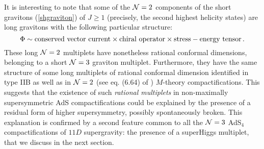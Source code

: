 \documentclass[a4paper,12pt]{article}
\begin{document}
It is interesting to note that some of the ${\cal N}=2$ components
of the short gravitons (\ref{shgraviton}) of $J\geq 1$ (precisely,
the second highest helicity states) are long gravitons with the
following particular structure:
\begin{equation}
  \Phi\sim{\rm conserved\ vector\ current}\times
  {\rm chiral\ operator}\times{\rm stress-energy\ tensor}\,.
\label{rational}
\end{equation}
These long ${\cal N}=2$ multiplets have nonetheless rational conformal
dimensions, belonging to a short ${\cal N}=3$ graviton multiplet.
Furthermore, they have the same structure of some long multiplets of
rational conformal dimension identified in type IIB \cite{sergiotorino}
as well as in ${\cal N}=2$ (see eq. (6.64) of \cite{3dcft})
$M$-theory compactifications.
This suggests that the existence of such {\it rational multiplets}
in non-maximally supersymmetric AdS compactifications could be
explained by the presence of a residual form of higher supersymmetry,
possibly spontaneously broken.
This explanation is confirmed by a second feature common to all the
${\cal N}=3$ AdS$_4$ compactifications of $11D$ supergravity: the
presence of a superHiggs multiplet, that we discuss in the next section.
\end{document}

